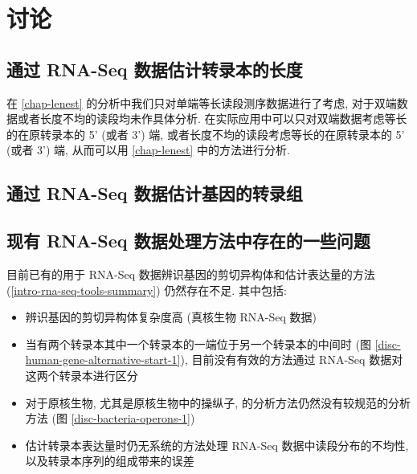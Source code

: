\chapter{讨论}

\section{通过 RNA-Seq 数据估计转录本的长度}
在 \ref{chap-lenest} 的分析中我们只对单端等长读段测序数据进行了考虑, 
对于双端数据或者长度不均的读段均未作具体分析. 
在实际应用中可以只对双端数据考虑等长的在原转录本的 5' (或者 3') 端, 
或者长度不均的读段考虑等长的在原转录本的 5' (或者 3') 端, 
从而可以用 \ref{chap-lenest} 中的方法进行分析. 

\section{通过 RNA-Seq 数据估计基因的转录组}

\section{现有 RNA-Seq 数据处理方法中存在的一些问题}
目前已有的用于 RNA-Seq 数据辨识基因的剪切异构体和估计表达量的方法 
(\ref{intro-rna-seq-tools-summary}) 仍然存在不足. 
其中包括: 
\begin{itemize}
\item 辨识基因的剪切异构体复杂度高 (真核生物 RNA-Seq 数据)

\item 当有两个转录本其中一个转录本的一端位于另一个转录本的中间时 
(图 \ref{disc-human-gene-alternative-start-1}), 
目前没有有效的方法通过 RNA-Seq 数据对这两个转录本进行区分

\item 对于原核生物, 尤其是原核生物中的操纵子, 的分析方法仍然没有较规范的分析方法 
\cite{mcclure2013computational} (图 \ref{disc-bacteria-operons-1})

\item 估计转录本表达量时仍无系统的方法处理 RNA-Seq 数据中读段分布的不均性, 
以及转录本序列的组成带来的误差 \cite{oshlack2009transcript, jones2012new} 
\end{itemize}

